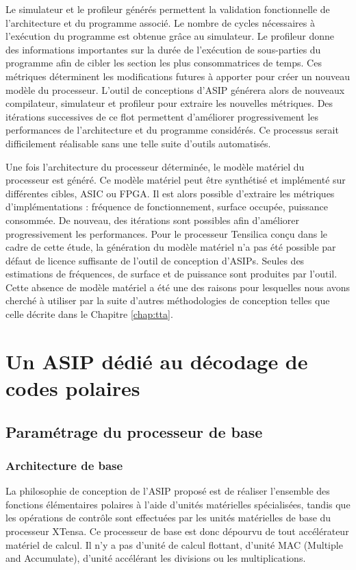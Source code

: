 Le simulateur et le profileur générés permettent la validation fonctionnelle de l'architecture et du programme associé. Le nombre de cycles nécessaires à l'exécution du programme est obtenue grâce au simulateur. Le profileur donne des informations importantes sur la durée de l'exécution de sous-parties du programme afin de cibler les section les plus consommatrices de temps. Ces métriques déterminent les modifications futures à apporter pour créer un nouveau modèle du processeur. L'outil de conceptions d'ASIP générera alors de nouveaux compilateur, simulateur et profileur pour extraire les nouvelles métriques. Des itérations successives de ce flot permettent d'améliorer progressivement les performances de l'architecture et du programme considérés. Ce processus serait difficilement réalisable sans une telle suite d'outils automatisés.

Une fois l'architecture du processeur déterminée, le modèle matériel du processeur est généré. Ce modèle matériel peut être synthétisé et implémenté sur différentes cibles, ASIC ou FPGA. Il est alors possible d'extraire les métriques d'implémentations : fréquence de fonctionnement, surface occupée, puissance consommée. De nouveau, des itérations sont possibles afin d'améliorer progressivement les performances.
Pour le processeur Tensilica conçu dans le cadre de cette étude, la génération du modèle matériel n'a pas été possible par défaut de licence suffisante de l'outil de conception d'ASIPs. Seules des estimations de fréquences, de surface et de puissance sont produites par l'outil. Cette absence de modèle matériel a été une des raisons pour lesquelles nous avons cherché à utiliser par la suite d'autres méthodologies de conception telles que celle décrite dans le Chapitre \ref{chap:tta}.

\section{Un ASIP dédié au décodage de codes polaires}
\label{subsec:sota_sc}
\subsection{Paramétrage du processeur de base}
\subsubsection{Architecture de base}
La philosophie de conception de l'ASIP proposé est de réaliser l'ensemble des fonctions élémentaires polaires à l'aide d'unités matérielles spécialisées, tandis que les opérations de contrôle sont effectuées par les unités matérielles de base du processeur XTensa. Ce processeur de base est donc dépourvu de tout accélérateur matériel de calcul. Il n'y a pas d'unité de calcul flottant, d'unité MAC (Multiple and Accumulate), d'unité accélérant les divisions ou les multiplications.

